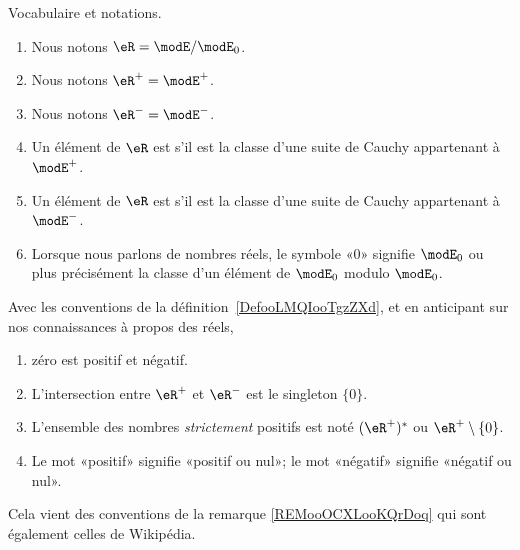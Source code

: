 \begin{definition}        \label{DefooLMQIooTgzZXd}
    Vocabulaire et notations.
    \begin{enumerate}
        \item
            Nous notons \( \eR=\modE/\modE_0\).
        \item
            Nous notons \( \eR^+=\modE^+\).
        \item
            Nous notons \( \eR^-=\modE^-\).
        \item
            Un élément de \( \eR\) est  s'il est la classe d'une suite de Cauchy appartenant à \( \modE^+\).
        \item
            Un élément de \( \eR\) est  s'il est la classe d'une suite de Cauchy appartenant à \( \modE^-\).
        \item
            Lorsque nous parlons de nombres réels, le symbole «\( 0\)» signifie \( \modE_0\) ou plus précisément la classe d'un élément de \( \modE_0\) modulo \( \modE_0\).
    \end{enumerate}
\end{definition}

\begin{normaltext}\label{REMooOCXLooKQrDoq}
    Avec les conventions de la définition~\ref{DefooLMQIooTgzZXd}, et en anticipant sur nos connaissances à propos des réels,
    \begin{enumerate}
        \item
            zéro est positif et négatif.
        \item
            L'intersection entre \( \eR^+\) et \( \eR^-\) est le singleton \( \{ 0 \}\).
        \item
            L'ensemble des nombres \emph{strictement} positifs est noté \( (\eR^+)^*\) ou \( \eR^+\setminus\{ 0 \}\).
        \item
            Le mot «positif» signifie «positif ou nul»; le mot «négatif» signifie «négatif ou nul».
    \end{enumerate}

    Cela vient des conventions de la remarque \ref{REMooOCXLooKQrDoq} qui sont également celles de Wikipédia\cite{ooSBSSooTlnuKi}.
\end{normaltext}


